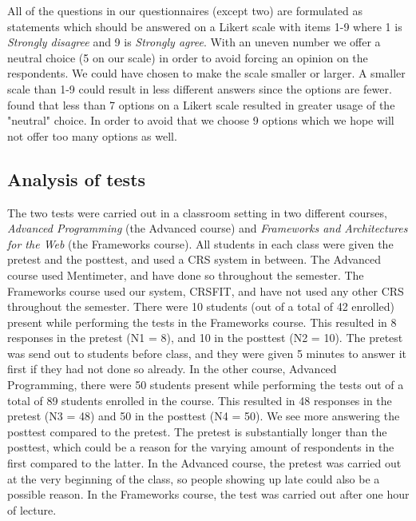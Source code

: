 All of the questions in our questionnaires (except two) are formulated as statements which should be answered on a Likert scale \cite{likert1932technique} with items 1-9 where 1 is \emph{Strongly disagree} and 9 is \emph{Strongly agree}. With an uneven number we offer a neutral choice (5 on our scale) in order to avoid forcing an opinion on the respondents. We could have chosen to make the scale smaller or larger. A smaller scale than 1-9 could result in less different answers since the options are fewer.  found that less than 7 options on a Likert scale resulted in greater usage of the "neutral" choice. In order to avoid that we choose 9 options which we hope will not offer too many options as well.




\subsection{Analysis of tests}

The two tests were carried out in a classroom setting in two different courses, \emph{Advanced Programming} (the Advanced course) and \emph{Frameworks and Architectures for the Web} (the Frameworks course). All students in each class were given the pretest and the posttest, and used a CRS system in between. The Advanced course used Mentimeter, and have done so throughout the semester. The Frameworks course used our system, CRSFIT, and have not used any other CRS throughout the semester.
There were 10 students (out of a total of 42 enrolled) present while performing the tests in the Frameworks course. This resulted in 8 responses in the pretest (N1 = 8), and 10 in the posttest (N2 = 10). The pretest was send out to students before class, and they were given 5 minutes to answer it first if they had not done so already.
In the other course, Advanced Programming, there were 50 students present while performing the tests out of a total of 89 students enrolled in the course. This resulted in 48 responses in the pretest (N3 = 48) and 50 in the posttest (N4 = 50). We see more answering the posttest compared to the pretest. The pretest is substantially longer than the posttest, which could be a reason for the varying amount of respondents in the first compared to the latter. In the Advanced course, the pretest was carried out at the very beginning of the class, so people showing up late could also be a possible reason. In the Frameworks course, the test was carried out after one hour of lecture.


